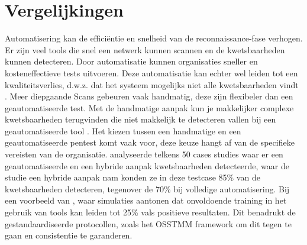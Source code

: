 \section{Vergelijkingen}
Automatisering kan de efficiëntie en snelheid van de reconnaissance-fase verhogen. Er zijn veel tools die snel een netwerk kunnen scannen en de kwetsbaarheden kunnen detecteren. 
Door automatisatie kunnen organisaties sneller en kosteneffectieve tests uitvoeren. Deze automatisatie kan echter wel leiden tot een kwaliteitsverlies, d.w.z. dat het systeem mogelijks niet alle kwetsbaarheden vindt \parencite{peris}. 
Meer diepgaande Scans gebeuren vaak handmatig, deze zijn flexibeler dan een geautomatiseerde test. Met de handmatige aanpak kun je makkelijker complexe kwetsbaarheden terugvinden die niet makkelijk te detecteren vallen bij een geautomatiseerde tool \parencite{techtarget2023}. 
Het kiezen tussen een handmatige en een geautomatiseerde pentest komt vaak voor, deze keuze hangt af van de specifieke vereisten van de organisatie. \textcite{Monero2025} analyseerde telkens 50 cases studies waar er een geautomatiseerde en een hybride aanpak kwetsbaarheden detecteerde, waar de studie een hybride aanpak nam konden ze in deze testcase 85\% van de kwetsbaarheden detecteren, tegenover de 70\% bij volledige automatisering.
Bij een voorbeeld van \parencite{Whitaker2005}, waar simulaties aantonen dat onvoldoende training in het gebruik van tools kan leiden tot 25\% vals positieve resultaten.
Dit benadrukt de gestandaardiseerde protocollen, zoals het OSSTMM framework om dit tegen te gaan en consistentie te garanderen.

